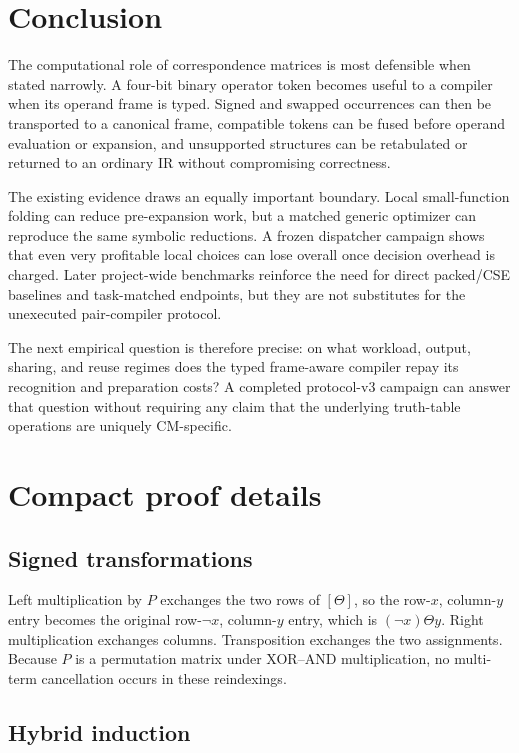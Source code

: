 \documentclass[10pt]{article}
\theoremstyle{plain}
\theoremstyle{definition}
\theoremstyle{remark}
\begin{document}
\section{Conclusion}

The computational role of correspondence matrices is most defensible when stated narrowly. A four-bit binary operator token becomes useful to a compiler when its operand frame is typed. Signed and swapped occurrences can then be transported to a canonical frame, compatible tokens can be fused before operand evaluation or expansion, and unsupported structures can be retabulated or returned to an ordinary IR without compromising correctness.

The existing evidence draws an equally important boundary. Local small-function folding can reduce pre-expansion work, but a matched generic optimizer can reproduce the same symbolic reductions. A frozen dispatcher campaign shows that even very profitable local choices can lose overall once decision overhead is charged. Later project-wide benchmarks reinforce the need for direct packed/CSE baselines and task-matched endpoints, but they are not substitutes for the unexecuted pair-compiler protocol.

The next empirical question is therefore precise: on what workload, output, sharing, and reuse regimes does the typed frame-aware compiler repay its recognition and preparation costs? A completed protocol-v3 campaign can answer that question without requiring any claim that the underlying truth-table operations are uniquely CM-specific.

\appendix

\section{Compact proof details}

\subsection{Signed transformations}

Left multiplication by $P$ exchanges the two rows of $[\Theta]$, so the row-$x$, column-$y$ entry becomes the original row-$\neg x$, column-$y$ entry, which is $(\neg x)\Theta y$. Right multiplication exchanges columns. Transposition exchanges the two assignments. Because $P$ is a permutation matrix under XOR--AND multiplication, no multi-term cancellation occurs in these reindexings.

\subsection{Hybrid induction}
\end{document}
